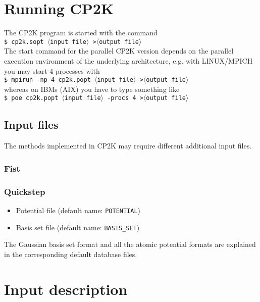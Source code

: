 \documentclass[12pt,twoside]{article}
\newcommand{\bi}{\begin{itemize}}
\newcommand{\ei}{\end{itemize}}
\newcommand{\la}{$\langle$}
\newcommand{\ra}{$\rangle$}
\begin{document}
\section{Running CP2K}
%
The CP2K program is started with the command\\[2mm]
{\tt \$ cp2k.sopt \la{\rm input file}\ra\ >\la{\rm output file}\ra}\\[2mm]
The start command for the parallel CP2K version depends on the parallel
execution environment of the underlying architecture, e.g.
with LINUX/MPICH you may start 4 processes with\\[2mm]
{\tt \$ mpirun -np 4 cp2k.popt \la{\rm input file}\ra\ >\la{\rm output file}\ra}\\[2mm]
whereas on IBMs (AIX) you have to type something like\\[2mm]
{\tt \$ poe cp2k.popt \la{\rm input file}\ra\ -procs 4 >\la{\rm output file}\ra}
%
\subsection{Input files}
%
The methods implemented in CP2K may require different additional input files.
%
\subsubsection{Fist}
%
\subsubsection{Quickstep}
%
\bi
 \item Potential file (default name: {\tt POTENTIAL})
 \item Basis set file (default name: {\tt BASIS\_SET})
\ei
The Gaussian basis set format and all the atomic potential formats are
explained in the corresponding default database files.
\newpage
%
\section{Input description}
%
\end{document}
